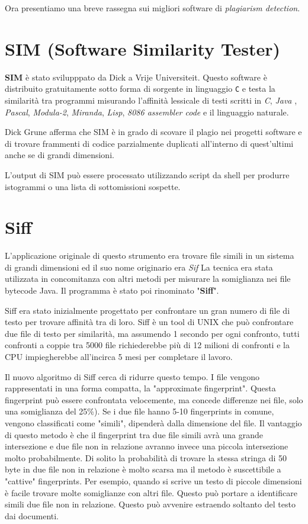 	Ora presentiamo una breve rassegna sui migliori software di \textit{plagiarism detection}.
	
	\section{SIM (Software Similarity Tester)}
		\textbf{SIM} è stato svilupppato da Dick \citep{SIM3.0.2} a Vrije Universiteit. Questo software è distribuito gratuitamente sotto forma di sorgente in linguaggio \verb|C| e testa la similarità tra programmi misurando l'affinità lessicale di testi scritti in \textit{C}, \textit{Java} , \textit{Pascal}, \textit{Modula-2}, \textit{Miranda}, \textit{Lisp}, \textit{8086 assembler code} e il linguaggio naturale.
		
		Dick Grune afferma che SIM è in grado di scovare il plagio nei progetti software e di trovare frammenti di codice parzialmente duplicati all'interno di quest'ultimi anche se di grandi dimensioni.
		
		L'output di SIM può essere processato utilizzando script da shell per produrre istogrammi o una lista di sottomissioni sospette.
	
	\section{Siff}
		L'applicazione originale di questo strumento era trovare file simili in un sistema di grandi dimensioni ed il suo nome originario era \textit{Sif} 
		La tecnica era stata utilizzata in concomitanza con altri metodi per misurare la somiglianza nei file bytecode Java. Il programma è stato poi rinominato "\textbf{Siff}". 

		Siff era stato inizialmente progettato per confrontare un gran numero di file di testo per trovare affinità tra di loro. Siff è un tool di UNIX che può confrontare due file di testo per similarità, ma assumendo 1 secondo per ogni confronto, tutti confronti a coppie tra 5000 file richiederebbe più di 12 milioni di confronti e la CPU impiegherebbe all'incirca 5 mesi per completare il lavoro.
		
		Il nuovo algoritmo di Siff cerca di ridurre questo tempo.
		I file vengono rappresentati in una forma compatta, la "approximate fingerprint". 
		Questa fingerprint può essere confrontata velocemente, ma concede differenze nei file, solo una somiglianza del 25\%). 
		Se i due file hanno 5-10 fingerprints in comune, vengono classificati come "simili", dipenderà dalla dimensione del file. 
		Il vantaggio di questo metodo è che il fingerprint tra due file simili avrà una grande intersezione e due file non in relazione avranno invece una piccola intersezione molto probabilmente. 
		Di solito la probabilità di trovare la stessa stringa di 50 byte in due file non in relazione è molto scarsa ma il metodo è suscettibile a "cattive" fingerprints.
		Per esempio, quando si scrive un testo di piccole dimensioni è facile trovare molte somiglianze con altri file. Questo può portare a identificare simili due file non in relazione. Questo può avvenire estraendo soltanto del testo dai documenti.
		
